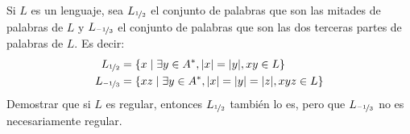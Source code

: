 \begin{ejercicio}\label{ej:1.3.38}
    Si $L$ es un lenguaje, sea $L_{\nicefrac{1}{2}}$ el conjunto de palabras que son las mitades de palabras de $L$ y $L_{\nicefrac{-1}{3}}$ el conjunto de palabras que son las dos terceras partes de palabras de $L$. Es decir:
    \begin{align*}
        L_{\nicefrac{1}{2}} &= \{x\mid \exists y\in A^\ast, |x|=|y|, xy\in L\} \\
        L_{\nicefrac{-1}{3}} &= \{xz\mid \exists y\in A^\ast, |x|=|y|=|z|, xyz\in L\}
    \end{align*}
    Demostrar que si $L$ es regular, entonces $L_{\nicefrac{1}{2}}$ también lo es, pero que $L_{\nicefrac{-1}{3}}$ no es necesariamente regular.

\end{ejercicio}

